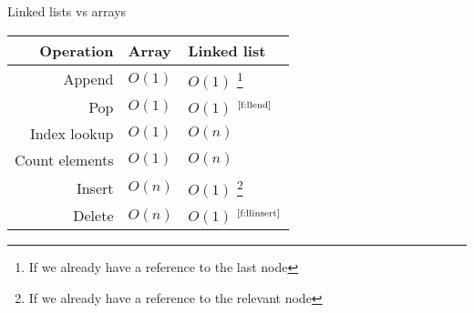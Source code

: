 \newcommand{\footnoteref}[1]{$^{\text{\ref{#1}}}$}

\begin{frame}{Linked lists vs arrays}
	\begin{center}
		\begin{tabular}{|r|l|l|}
			\hline
			\textbf{Operation} & \textbf{Array} & \textbf{Linked list} \\\hline
			\pause Append & $O(1)$ & $O(1)$ \footnote{\label{f:llend}If we already have a reference to the last node} \\
			\pause Pop & $O(1)$ & $O(1)$ \footnoteref{f:llend} \\
			\pause Index lookup & $O(1)$ & $O(n)$ \\
			\pause Count elements & $O(1)$ & $O(n)$ \\
			\pause Insert & $O(n)$ & $O(1)$ \footnote{\label{f:llinsert}If we already have a reference to the relevant node} \\
			\pause Delete & $O(n)$ & $O(1)$ \footnoteref{f:llinsert} \\
			\hline
		\end{tabular}
	\end{center}
\end{frame}
